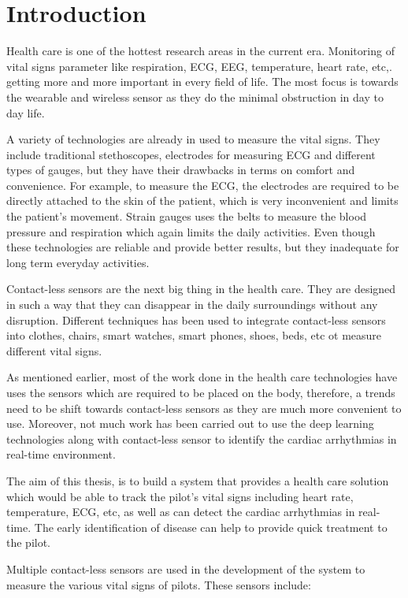 \chapter{Introduction}
Health care is one of the hottest research areas in the current era. Monitoring of vital signs parameter like respiration, ECG, EEG, temperature, heart rate, etc,. getting more and more important in every field of life. The most focus is towards the wearable and wireless sensor as they do the minimal obstruction in day to day life.

A variety of technologies are already in used to measure the vital signs. They include traditional stethoscopes, electrodes for measuring ECG and different types of gauges, but they have their drawbacks in terms on comfort and convenience. For example, to measure the ECG, the electrodes are required to be directly attached to the skin of the patient, which is very inconvenient and limits the patient's movement. Strain gauges uses the belts to measure the blood pressure and respiration which again limits the daily activities. Even though these technologies are reliable and provide better results, but they inadequate for long term everyday activities.

Contact-less sensors are the next big thing in the health care. They are designed in such a way that they can disappear in the daily surroundings without any disruption. Different techniques has been used to integrate contact-less sensors into clothes, chairs, smart watches, smart phones, shoes, beds, etc ot measure different vital signs.


As mentioned earlier, most of the work done in the health care technologies have uses the sensors which are required to be placed on the body, therefore, a trends need to be shift towards contact-less sensors as they are much more convenient to use. Moreover, not much work has been carried out to use the deep learning technologies along with contact-less sensor to identify the cardiac arrhythmias in real-time environment. 

The aim of this thesis, is to build a system that provides a health care solution which would be able to track the pilot's vital signs including heart rate, temperature, ECG, etc, as well as can detect the cardiac arrhythmias in real-time. The early identification of disease can help to provide quick treatment to the pilot.

Multiple contact-less sensors are used in the development of the system to measure the various vital signs of pilots. These sensors include:

